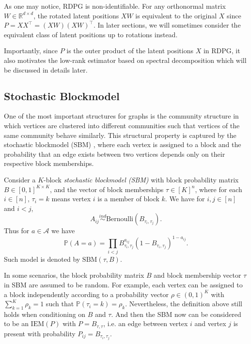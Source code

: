 As one may notice, RDPG is non-identifiable. For any orthonormal matrix $W \in \mathbb{R}^{d \times d}$, the rotated latent positions $X W$ is equivalent to the original $X$ since $P = X X^{\top} = (XW) (XW)^{\top}$. In later sections, we will sometimes consider the equivalent class of latent positions up to rotations instead.

Importantly, since $P$ is the outer product of the latent positions $X$ in RDPG, it also motivates the low-rank estimator based on spectral decomposition which will be discussed in details later.


\subsection{Stochastic Blockmodel}
\label{sec:SBM}

One of the most important structures for graphs is the community structure in which vertices are clustered into different communities such that vertices of the same community behave similarly. This structural property is captured by the stochastic blockmodel (SBM) \citep{holland1983stochastic}, where each vertex is assigned to a block and the probability that an edge exists between two vertices depends only on their respective block memberships.

\begin{definition} 
\label{def:SBM}
Consider a $K$-block {\em{stochastic blockmodel (SBM)}} with block probability matrix $B \in [0,1]^{K \times K}$, and the vector of block memberships $\tau \in [K]^n$, where for each $i \in [n]$, $\tau_i = k$ means vertex $i$ is a member of block $k$. We have for $i, j \in [n]$ and $i < j$,
\[
	A_{ij} \stackrel{ind}{\sim} \mathrm{Bernoulli}(B_{\tau_i,\tau_j}).
\]
Thus for $a \in \mathcal{A}$ we have
\[
	\mathbb{P}(A = a) = \prod_{i < j} B_{\tau_i,\tau_j}^{a_{ij}} (1 - B_{\tau_i,\tau_j})^{1 - a_{ij}}.
\]
Such model is denoted by $\mathrm{SBM}(\tau, B)$.
\end{definition}

In some scenarios, the block probability matrix $B$ and block membership vector $\tau$ in SBM are assumed to be random. For example, each vertex can be assigned to a block independently according to a probability vector $\rho  \in (0,1)^K$ with $\sum_{k=1}^K \rho_k = 1$ such that $\mathbb{P}(\tau_i = k) = \rho_k$. Nevertheless, the definition above still holds when conditioning on $B$ and $\tau$. And then the SBM now can be considered to be an $\mathrm{IEM}(P)$ with $P = B_{\tau, \tau}$, i.e. an edge between vertex $i$ and vertex $j$ is present with probability $P_{ij} = B_{\tau_i, \tau_j}$.

